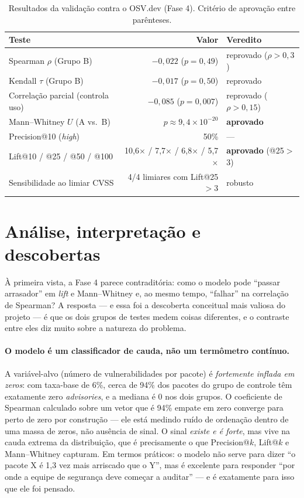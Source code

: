 \documentclass[11pt,a4paper]{article}
\begin{document}
\begin{table}[h]
\centering\small
\caption{Resultados da validação contra o OSV.dev (Fase 4). Critério de aprovação
entre parênteses.}
\label{tab:validacao}
\begin{tabular}{lrl}
\toprule
Teste & Valor & Veredito \\
\midrule
Spearman $\rho$ (Grupo B) & $-0{,}022$ ($p=0{,}49$) & reprovado ($\rho>0{,}3$) \\
Kendall $\tau$ (Grupo B)  & $-0{,}017$ ($p=0{,}50$) & reprovado \\
Correlação parcial (controla uso) & $-0{,}085$ ($p=0{,}007$) & reprovado ($\rho>0{,}15$) \\
Mann--Whitney $U$ (A vs.\ B) & $p\approx 9{,}4\times10^{-20}$ & \textbf{aprovado} \\
Precision@10 (\emph{high}) & 50\% & --- \\
Lift@10 / @25 / @50 / @100 & 10,6$\times$ / 7,7$\times$ / 6,8$\times$ / 5,7$\times$ & \textbf{aprovado} (@25$>$3) \\
Sensibilidade ao limiar CVSS & 4/4 limiares com Lift@25$>$3 & robusto \\
\bottomrule
\end{tabular}
\end{table}

\section{Análise, interpretação e descobertas}\label{sec:analise}

À primeira vista, a Fase 4 parece contraditória: como o modelo pode ``passar
arrasador'' em \emph{lift} e Mann--Whitney e, ao mesmo tempo, ``falhar'' na
correlação de Spearman? A resposta --- e essa foi a descoberta conceitual mais
valiosa do projeto --- é que os dois grupos de testes medem coisas diferentes, e o
contraste entre eles diz muito sobre a natureza do problema.

\paragraph{O modelo é um classificador de cauda, não um termômetro contínuo.}
A variável-alvo (número de vulnerabilidades por pacote) é \emph{fortemente inflada em
zeros}: com taxa-base de 6\%, cerca de 94\% dos pacotes do grupo de controle têm
exatamente zero \emph{advisories}, e a mediana é 0 nos dois grupos. O coeficiente de
Spearman calculado sobre um vetor que é 94\% empate em zero converge para perto de
zero por construção --- ele está medindo ruído de ordenação dentro de uma massa de
zeros, não ausência de sinal. O sinal \emph{existe e é forte}, mas vive na cauda
extrema da distribuição, que é precisamente o que Precision@$k$, Lift@$k$ e
Mann--Whitney capturam. Em termos práticos: o modelo não serve para dizer ``o pacote
X é 1,3 vez mais arriscado que o Y'', mas é excelente para responder ``por onde a
equipe de segurança deve começar a auditar'' --- e é exatamente para isso que ele foi
pensado.
\end{document}
